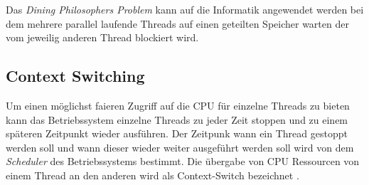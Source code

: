 Das \emph{Dining Philosophers Problem} kann auf die Informatik angewendet werden bei dem mehrere parallel laufende Threads auf einen geteilten Speicher warten der vom jeweilig anderen Thread blockiert wird. 

\subsection{Context Switching}
Um einen möglichst faieren Zugriff auf die CPU für einzelne Threads zu bieten kann das Betriebssystem einzelne Threads zu jeder Zeit stoppen und zu einem späteren Zeitpunkt wieder ausführen. Der Zeitpunk wann ein Thread gestoppt werden soll und wann dieser wieder weiter ausgeführt werden soll wird von dem \emph{Scheduler} des Betriebssystems bestimmt. Die übergabe von CPU Ressourcen von einem Thread an den anderen wird als Context-Switch bezeichnet \cite[p. 23]{Sto2013}.
